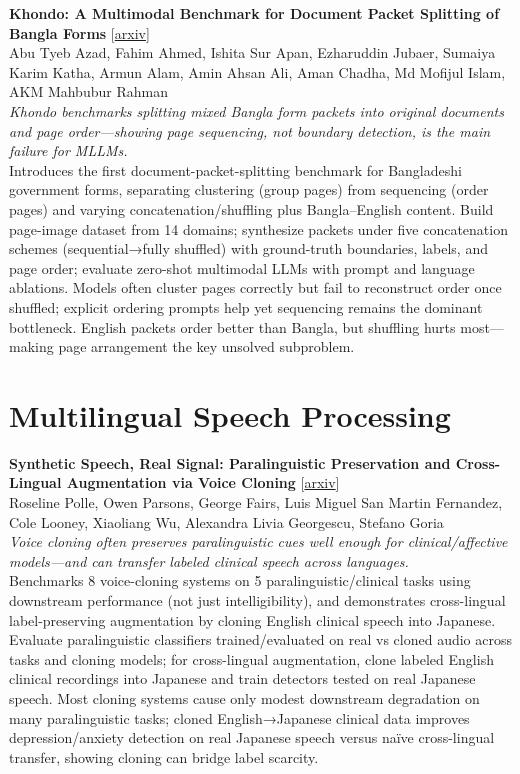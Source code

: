 \documentclass[12pt,letterpaper]{article}
\begin{document}
\medskip

{\small\textbf{Khondo: A Multimodal Benchmark for Document Packet Splitting of Bangla Forms}} {\scriptsize[\href{https://arxiv.org/abs/2607.21780}{arxiv}]}\\
{\scriptsize Abu Tyeb Azad, Fahim Ahmed, Ishita Sur Apan, Ezharuddin Jubaer, Sumaiya Karim Katha, Armun Alam, Amin Ahsan Ali, Aman Chadha, Md Mofijul Islam, AKM Mahbubur Rahman}\\

{\small\textit{Khondo benchmarks splitting mixed Bangla form packets into original documents and page order---showing page sequencing, not boundary detection, is the main failure for MLLMs.}}\\[1pt]
{\footnotesize Introduces the first document-packet-splitting benchmark for Bangladeshi government forms, separating clustering (group pages) from sequencing (order pages) and varying concatenation/shuffling plus Bangla--English content. Build page-image dataset from 14 domains; synthesize packets under five concatenation schemes (sequential→fully shuffled) with ground-truth boundaries, labels, and page order; evaluate zero-shot multimodal LLMs with prompt and language ablations. Models often cluster pages correctly but fail to reconstruct order once shuffled; explicit ordering prompts help yet sequencing remains the dominant bottleneck. English packets order better than Bangla, but shuffling hurts most---making page arrangement the key unsolved subproblem.}

\medskip


\section*{Multilingual Speech Processing}

{\small\textbf{Synthetic Speech, Real Signal: Paralinguistic Preservation and Cross-Lingual Augmentation via Voice Cloning}} {\scriptsize[\href{https://arxiv.org/abs/2607.22304}{arxiv}]}\\
{\scriptsize Roseline Polle, Owen Parsons, George Fairs, Luis Miguel San Martin Fernandez, Cole Looney, Xiaoliang Wu, Alexandra Livia Georgescu, Stefano Goria}\\

{\small\textit{Voice cloning often preserves paralinguistic cues well enough for clinical/affective models---and can transfer labeled clinical speech across languages.}}\\[1pt]
{\footnotesize Benchmarks 8 voice-cloning systems on 5 paralinguistic/clinical tasks using downstream performance (not just intelligibility), and demonstrates cross-lingual label-preserving augmentation by cloning English clinical speech into Japanese. Evaluate paralinguistic classifiers trained/evaluated on real vs cloned audio across tasks and cloning models; for cross-lingual augmentation, clone labeled English clinical recordings into Japanese and train detectors tested on real Japanese speech. Most cloning systems cause only modest downstream degradation on many paralinguistic tasks; cloned English→Japanese clinical data improves depression/anxiety detection on real Japanese speech versus naïve cross-lingual transfer, showing cloning can bridge label scarcity.}
\end{document}
